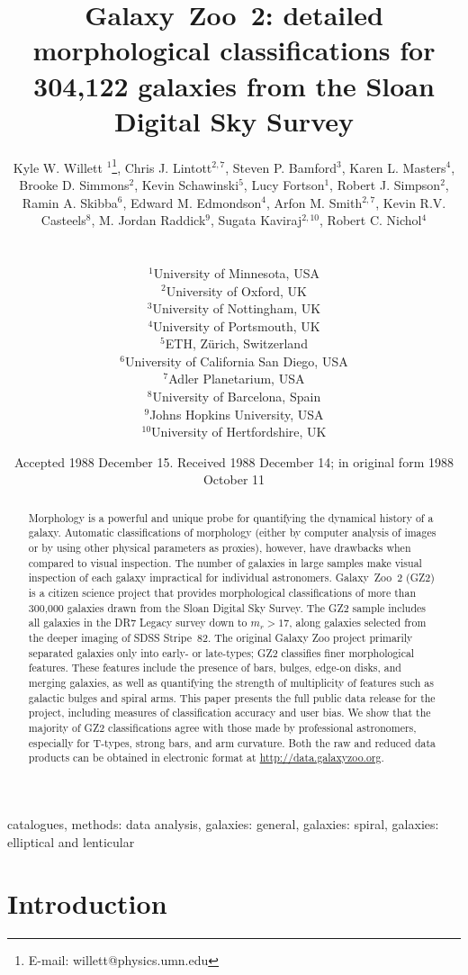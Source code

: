 \documentclass[useAMS,usenatbib]{mn2e}
\title[GZ2 data release]{Galaxy~Zoo~2: detailed morphological classifications for 304,122 galaxies from the Sloan Digital Sky Survey}
\author[Willett et al.]{
  \parbox[t]{16cm}{
  Kyle W. Willett $^{1}$\thanks{E-mail: willett@physics.umn.edu},
  Chris J. Lintott$^{2,7}$,
  Steven P. Bamford$^{3}$,
  Karen L. Masters$^{4}$,
  Brooke D. Simmons$^{2}$,
  Kevin Schawinski$^{5}$,
  Lucy Fortson$^{1}$,
  Robert J. Simpson$^{2}$,
  Ramin A. Skibba$^{6}$,
  Edward M. Edmondson$^{4}$,
  Arfon M. Smith$^{2,7}$,
  Kevin R.V. Casteels$^{8}$,
  M. Jordan Raddick$^{9}$,
  Sugata Kaviraj$^{2,10}$,
  Robert C. Nichol$^{4}$\\
  }\\
$^{1}$University of Minnesota, USA \\
$^{2}$University of Oxford, UK \\
$^{3}$University of Nottingham, UK \\
$^{4}$University of Portsmouth, UK \\
$^{5}$ETH, Z\"urich, Switzerland \\
$^{6}$University of California San Diego, USA \\
$^{7}$Adler Planetarium, USA \\
$^{8}$University of Barcelona, Spain \\
$^{9}$Johns Hopkins University, USA \\
$^{10}$University of Hertfordshire, UK \\
}
\begin{document}
\date{Accepted 1988 December 15. Received 1988 December 14; in original form 1988 October 11}

\pagerange{\pageref{firstpage}--\pageref{lastpage}} 

\maketitle

\label{firstpage}

\begin{abstract}
Morphology is a powerful and unique probe for quantifying the dynamical history of a galaxy. Automatic classifications of morphology (either by computer analysis of images or by using other physical parameters as proxies), however, have drawbacks when compared to visual inspection. The number of galaxies in large samples make visual inspection of each galaxy impractical for individual astronomers. Galaxy~Zoo~2 (GZ2) is a citizen science project that provides morphological classifications of more than 300,000 galaxies drawn from the Sloan Digital Sky Survey. The GZ2 sample includes all galaxies in the DR7 Legacy survey down to $m_r>17$, along galaxies selected from the deeper imaging of SDSS Stripe~82. The original Galaxy Zoo project primarily separated galaxies only into early- or late-types; GZ2 classifies finer morphological features. These features include the presence of bars, bulges, edge-on disks, and merging galaxies, as well as quantifying the strength of multiplicity of features such as galactic bulges and spiral arms. This paper presents the full public data release for the project, including measures of classification accuracy and user bias. We show that the majority of GZ2 classifications agree with those made by professional astronomers, especially for T-types, strong bars, and arm curvature. Both the raw and reduced data products can be obtained in electronic format at \url{http://data.galaxyzoo.org}.
\end{abstract}

\begin{keywords}
catalogues, methods: data analysis, galaxies: general, galaxies: spiral, galaxies: elliptical and lenticular
\end{keywords}


\section{Introduction} \label{sec-intro}
\end{document}
